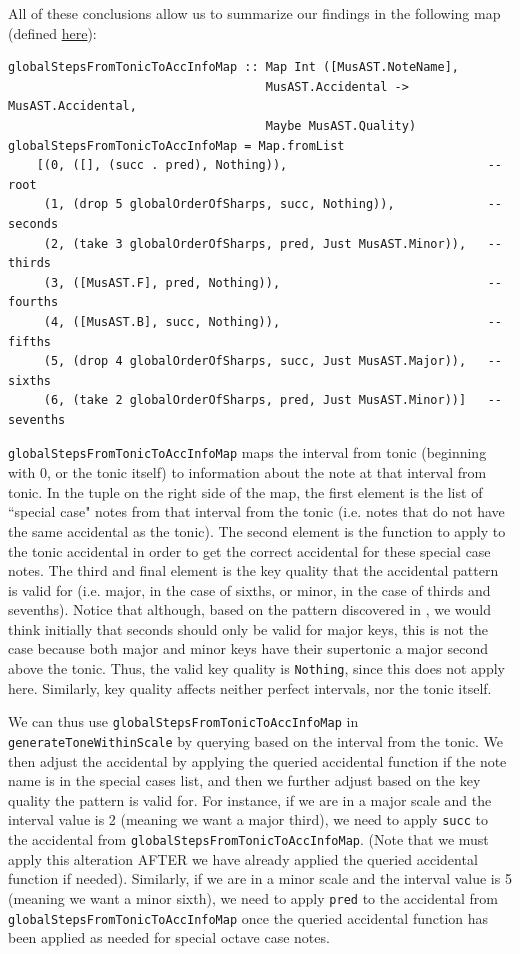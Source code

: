 \documentclass{report}
\begin{document}
All of these conclusions allow us to summarize our findings in the following map (defined \href{https://github.com/ilanashapiro/MusAssist/blob/main/app/IRConversion.hs}{here}):
\begin{verbatim}
globalStepsFromTonicToAccInfoMap :: Map Int ([MusAST.NoteName],
                                    MusAST.Accidental -> MusAST.Accidental, 
                                    Maybe MusAST.Quality)
globalStepsFromTonicToAccInfoMap = Map.fromList
    [(0, ([], (succ . pred), Nothing)),                            -- root
     (1, (drop 5 globalOrderOfSharps, succ, Nothing)),             -- seconds
     (2, (take 3 globalOrderOfSharps, pred, Just MusAST.Minor)),   -- thirds
     (3, ([MusAST.F], pred, Nothing)),                             -- fourths
     (4, ([MusAST.B], succ, Nothing)),                             -- fifths
     (5, (drop 4 globalOrderOfSharps, succ, Just MusAST.Major)),   -- sixths
     (6, (take 2 globalOrderOfSharps, pred, Just MusAST.Minor))]   -- sevenths
\end{verbatim}

\verb.globalStepsFromTonicToAccInfoMap. maps the interval from tonic (beginning with 0, or the tonic itself) to information about the note at that interval from tonic. In the tuple on the right side of the map, the first element is the list of ``special case" notes from that interval from the tonic (i.e. notes that do not have the same accidental as the tonic). The second element is the function to apply to the tonic accidental in order to get  the correct accidental for these special case notes. The third and final element is the key quality that the accidental pattern is valid for (i.e. major, in the case of sixths, or minor, in the case of thirds and sevenths). Notice that although, based on the pattern discovered in , we would think initially that seconds should only be valid for major keys, this is not the case because both major and minor keys have their supertonic a major second above the tonic. Thus, the valid key quality is \verb.Nothing., since this does not apply here. Similarly, key quality affects neither perfect intervals, nor the tonic itself.

We can thus use \verb.globalStepsFromTonicToAccInfoMap. in \verb.generateToneWithinScale. by querying based on the interval from the tonic. We then adjust the accidental by applying the queried accidental function if the note name is in the special cases list, and then we further adjust based on the key quality the pattern is valid for. For instance, if we are in a major scale and the interval value is 2 (meaning we want a major third), we need to apply \verb.succ. to the accidental from  \verb.globalStepsFromTonicToAccInfoMap.. (Note that we must apply this alteration AFTER we have already applied the queried accidental function if needed). Similarly, if we are in a minor scale and the interval value is 5 (meaning we want a minor sixth), we need to apply \verb.pred. to the accidental from  \verb.globalStepsFromTonicToAccInfoMap. once the queried accidental function has been applied as needed for special octave case notes.
\end{document}
